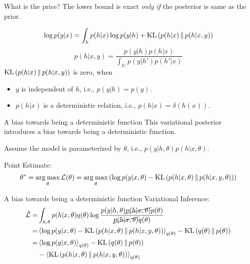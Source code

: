 \documentclass[14pt,aspectratio=1610]{beamer}
\newcommand{\bound}{\mathcal{L}}
\newcommand{\argmax}{\operatorname*{arg\: max}}
\begin{document}
\begin{frame}{What is the price?}
The lower bound is exact \textit{only if} the posterior is same as the prior.

\begin{align*}
\log p(y | x) = \int_{h} p(h|x) \log p(y| h) + \text{KL}\left( p(h|x)\,\|\,p(h|x, y) \right)
\end{align*}
\vspace{-5mm}
\[
p(h|x, y) = \frac{p(y|h) p(h|x)}{\int_{h'} p(y|h') p(h'|x)}
\]
\vspace{-5mm}
$\text{KL}\left( p(h|x)\,\|\,p(h|x, y) \right)$ is zero, when
\begin{itemize}
\item $y$ is independent of $h$, i.e., $p(y|h) = p(y)$.
\item $p(h|x)$ is a deterministic relation, i.e., $p(h|x) = \delta(h(x))$.
\end{itemize}
\end{frame}

\begin{frame}{A bias towards being a deterministic function}
This variational posterior introduces a bias towards being a deterministic function.

Assume the model is parameterized by $\theta$, i.e., $p(y|h, \theta) p(h|x, \theta)$.

Point Estimate: 
\begin{align*}
\theta^* = \argmax_{\theta} \bound(\theta) = \argmax_{\theta}  \left( \log p(y | x, \theta) - \KL{p(h|x, \theta)}{p(h|x, y, \theta)} \right)
\end{align*}
\end{frame}

\begin{frame}{A bias towards being a deterministic function}
Variational Inference:
\begin{align*}
\hat{\bound} =& \int_{h, \theta} p(h|x, \theta) q(\theta) \log \frac{p(y|h, \theta) \cancel{p(h|x,\theta)} p(\theta)}{\cancel{p(h|x, \theta)} q(\theta)} \\
=& \expectation{\log p(y | x, \theta) - \KL{p(h|x, \theta)}{p(h|x, y, \theta)}}_{q(\theta)} - \KL{q(\theta)}{p(\theta)} \\
=& \expectation{\log p(y | x, \theta)}_{q(\theta)} - \KL{q(\theta)}{p(\theta)} \\
& - \expectation{\KL{p(h|x, \theta)}{p(h|x, y, \theta)}}_{q(\theta)}
\end{align*}
\end{frame}
\end{document}
